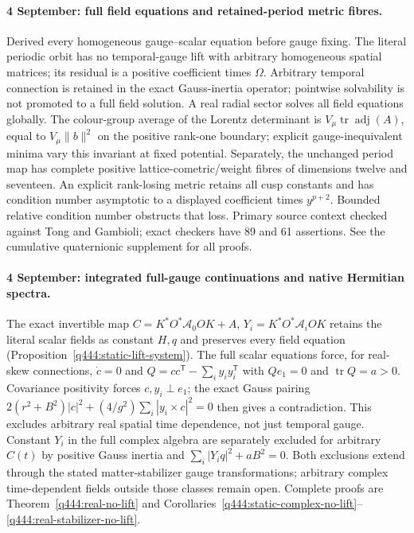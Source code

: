 \paragraph{4 September: full field equations and retained-period metric fibres.}
Derived every homogeneous gauge--scalar equation before gauge fixing.
The literal periodic orbit has no temporal-gauge lift with arbitrary
homogeneous spatial matrices; its residual is a positive coefficient
times $\Omega$. Arbitrary temporal connection is retained in the exact
Gauss-inertia operator; pointwise solvability is not promoted to a full
field solution. A real radial sector solves all field equations globally.
The colour-group average of the Lorentz determinant is
$V_\mu\operatorname{tr}\operatorname{adj}(A)$, equal to $V_\mu\|b\|^2$
on the positive rank-one boundary; explicit gauge-inequivalent minima
vary this invariant at fixed potential. Separately, the unchanged period
map has complete positive lattice-cometric/weight fibres of dimensions twelve and seventeen.
An explicit rank-losing metric retains all cusp constants and has
condition number asymptotic to a displayed coefficient times $y^{p+2}$.
Bounded relative condition number obstructs that loss. Primary source
context checked against Tong and Gambioli; exact checkers have 89 and
61 assertions. See the cumulative quaternionic supplement for all proofs.

\paragraph{4 September: integrated full-gauge continuations and native Hermitian spectra.}
The exact invertible map
$C=K^*O^*\mathcal A_0OK+A$, $Y_i=K^*O^*\mathcal A_iOK$
retains the literal scalar fields as constant $H,q$ and preserves every
field equation (Proposition~\ref{q444:static-lift-system}). The full scalar
equations force, for real-skew connections, $\dot c=0$ and
$Q=cc^{\mathsf T}-\sum_i y_iy_i^{\mathsf T}$ with $Qe_1=0$ and
$\operatorname{tr}Q=a>0$. Covariance positivity forces $c,y_i\perp e_1$;
the exact Gauss pairing
$2(r^2+B^2)|c|^2+(4/g^2)\sum_i|y_i\times c|^2=0$
then gives a contradiction. This excludes arbitrary real spatial time
dependence, not just temporal gauge. Constant $Y_i$ in the full complex
algebra are separately excluded for arbitrary $C(t)$ by positive Gauss
inertia and $\sum_i|Y_iq|^2+aB^2=0$. Both exclusions extend through
the stated matter-stabilizer gauge transformations; arbitrary complex
time-dependent fields outside those classes remain open. Complete proofs
are Theorem~\ref{q444:real-no-lift} and
Corollaries~\ref{q444:static-complex-no-lift}--\ref{q444:real-stabilizer-no-lift}.

